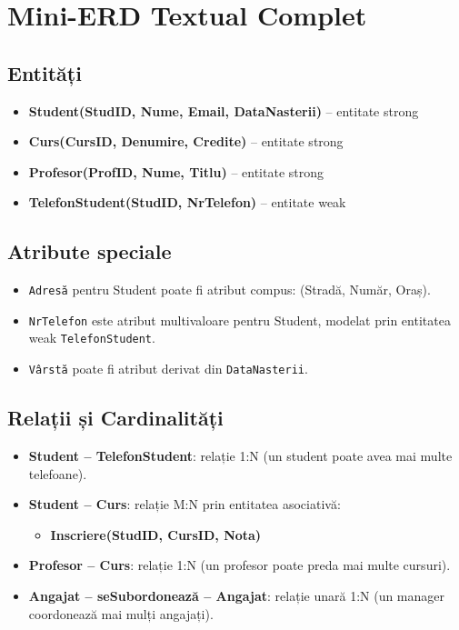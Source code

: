 \documentclass[12pt,a4paper]{article}
\begin{document}
\section{Mini-ERD Textual Complet}

\subsection*{Entități}
\begin{itemize}[noitemsep]
    \item \textbf{Student(StudID, Nume, Email, DataNasterii)} -- entitate strong
    \item \textbf{Curs(CursID, Denumire, Credite)} -- entitate strong
    \item \textbf{Profesor(ProfID, Nume, Titlu)} -- entitate strong
    \item \textbf{TelefonStudent(StudID, NrTelefon)} -- entitate weak
\end{itemize}

\subsection*{Atribute speciale}
\begin{itemize}[noitemsep]
    \item \texttt{Adresă} pentru Student poate fi atribut compus: (Stradă, Număr, Oraș).
    \item \texttt{NrTelefon} este atribut multivaloare pentru Student, modelat prin entitatea weak \texttt{TelefonStudent}.
    \item \texttt{Vârstă} poate fi atribut derivat din \texttt{DataNasterii}.
\end{itemize}

\subsection*{Relații și Cardinalități}
\begin{itemize}[noitemsep]
    \item \textbf{Student -- TelefonStudent}: relație 1:N (un student poate avea mai multe telefoane).
    \item \textbf{Student -- Curs}: relație M:N prin entitatea asociativă:
    \begin{itemize}[noitemsep]
        \item \textbf{Inscriere(StudID, CursID, Nota)}
    \end{itemize}
    \item \textbf{Profesor -- Curs}: relație 1:N (un profesor poate preda mai multe cursuri).
    \item \textbf{Angajat -- seSubordonează -- Angajat}: relație unară 1:N (un manager coordonează mai mulți angajați).
\end{itemize}
\end{document}
